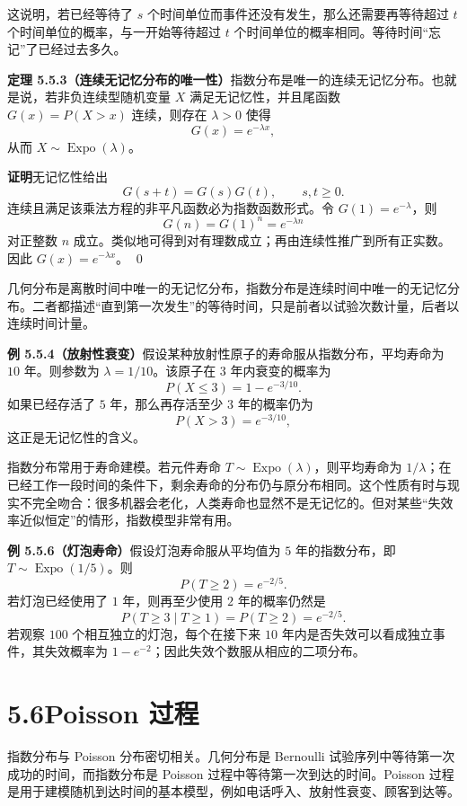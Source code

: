 \documentclass[UTF8,12pt,a4paper,fontset=fandol]{ctexart}
\begin{document}
这说明，若已经等待了 $s$ 个时间单位而事件还没有发生，那么还需要再等待超过 $t$ 个时间单位的概率，与一开始等待超过 $t$ 个时间单位的概率相同。等待时间“忘记”了已经过去多久。

\noindent\textbf{定理 5.5.3（连续无记忆分布的唯一性）}\quad 指数分布是唯一的连续无记忆分布。也就是说，若非负连续型随机变量 $X$ 满足无记忆性，并且尾函数 $G(x)=P(X>x)$ 连续，则存在 $\lambda>0$ 使得
\[
  G(x)=e^{-\lambda x},
\]
从而 $X\sim\operatorname{Expo}(\lambda)$。

\noindent\textbf{证明}\quad 无记忆性给出
\[
  G(s+t)=G(s)G(t),\qquad s,t\ge0.
\]
连续且满足该乘法方程的非平凡函数必为指数函数形式。令 $G(1)=e^{-\lambda}$，则
\[
  G(n)=G(1)^n=e^{-\lambda n}
\]
对正整数 $n$ 成立。类似地可得到对有理数成立；再由连续性推广到所有正实数。因此 $G(x)=e^{-\lambda x}$。
\qed

几何分布是离散时间中唯一的无记忆分布，指数分布是连续时间中唯一的无记忆分布。二者都描述“直到第一次发生”的等待时间，只是前者以试验次数计量，后者以连续时间计量。

\noindent\textbf{例 5.5.4（放射性衰变）}\quad 假设某种放射性原子的寿命服从指数分布，平均寿命为 $10$ 年。则参数为 $\lambda=1/10$。该原子在 $3$ 年内衰变的概率为
\[
  P(X\le3)=1-e^{-3/10}.
\]
如果已经存活了 $5$ 年，那么再存活至少 $3$ 年的概率仍为
\[
  P(X>3)=e^{-3/10},
\]
这正是无记忆性的含义。

指数分布常用于寿命建模。若元件寿命 $T\sim\operatorname{Expo}(\lambda)$，则平均寿命为 $1/\lambda$；在已经工作一段时间的条件下，剩余寿命的分布仍与原分布相同。这个性质有时与现实不完全吻合：很多机器会老化，人类寿命也显然不是无记忆的。但对某些“失效率近似恒定”的情形，指数模型非常有用。

\noindent\textbf{例 5.5.6（灯泡寿命）}\quad 假设灯泡寿命服从平均值为 $5$ 年的指数分布，即 $T\sim\operatorname{Expo}(1/5)$。则
\[
  P(T\ge2)=e^{-2/5}.
\]
若灯泡已经使用了 $1$ 年，则再至少使用 $2$ 年的概率仍然是
\[
  P(T\ge3\mid T\ge1)=P(T\ge2)=e^{-2/5}.
\]
若观察 $100$ 个相互独立的灯泡，每个在接下来 $10$ 年内是否失效可以看成独立事件，其失效概率为 $1-e^{-2}$；因此失效个数服从相应的二项分布。

\section*{5.6\quad Poisson 过程}

指数分布与 Poisson 分布密切相关。几何分布是 Bernoulli 试验序列中等待第一次成功的时间，而指数分布是 Poisson 过程中等待第一次到达的时间。Poisson 过程是用于建模随机到达时间的基本模型，例如电话呼入、放射性衰变、顾客到达等。
\end{document}
